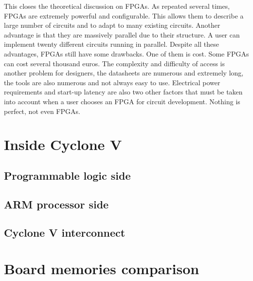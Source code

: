 This closes the theoretical discussion on FPGAs. As repeated several times, FPGAs are extremely 
powerful and configurable. This allows them to describe a large number of circuits and to adapt to
many existing circuits. Another advantage is that they are massively parallel due to their 
structure. A user can implement twenty different circuits running in parallel. Despite all these 
advantages, FPGAs still have some drawbacks. One of them is cost. Some FPGAs can cost several 
thousand euros. The complexity and difficulty of access is another problem for designers, the 
datasheets are numerous and extremely long, the tools are also numerous and not always easy to use. 
Electrical power requirements and start-up latency are also two other factors that must be taken 
into account when a user chooses an FPGA for circuit development. Nothing is perfect, not even 
FPGAs.

\section{Inside Cyclone V}

\subsection{Programmable logic side}

\subsection{ARM processor side}

\subsection{Cyclone V interconnect}

\section{Board memories comparison}
